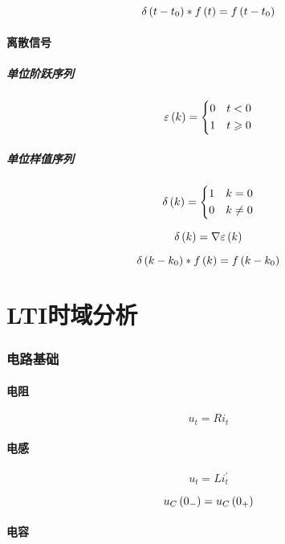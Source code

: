\documentclass{article}
\begin{document}
\[\delta\left(t-t_0\right)\ast f\left(t\right)=f\left(t-t_0\right)\]

\subsection{离散信号}

\subsubsection{单位阶跃序列}

\[\varepsilon\left(k\right)=
    \left\{\begin{aligned}
        0 &  & t<0         \\
        1 &  & t\geqslant0
    \end{aligned}\right.\]


\subsubsection{单位样值序列}

\[\delta\left(k\right)=
    \left\{\begin{aligned}
        1 &  & k=0    \\
        0 &  & k\neq0
    \end{aligned}\right.\]

\[\delta\left(k\right)=\nabla\varepsilon\left(k\right)\]

\[\delta\left(k-k_0\right)\ast f\left(k\right)=f\left(k-k_0\right)\]

\part{LTI时域分析}

\section{电路基础}

\subsection{电阻}

\[u_t=Ri_t\]

\subsection{电感}

\[u_t=Li_t^\prime\]

\[u_C\left(0_-\right)=u_C\left(0_+\right)\]

\subsection{电容}
\end{document}
